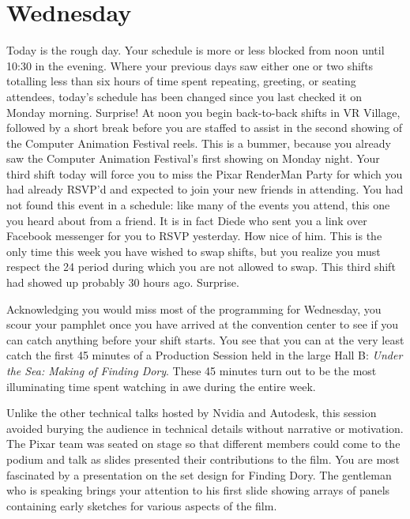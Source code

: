 \documentclass[../main.tex]{subfiles}
\begin{document}
\section{Wednesday}

Today is the rough day. Your schedule is more or less blocked from noon until 10:30 in the evening. Where your previous days saw either one or two shifts totalling less than six hours of time spent repeating, greeting, or seating attendees, today's schedule has been changed since you last checked it on Monday morning. Surprise! At noon you begin back-to-back shifts in VR Village, followed by a short break before you are staffed to assist in the second showing of the Computer Animation Festival reels. This is a bummer, because you already saw the Computer Animation Festival's first showing on Monday night. Your third shift today will force you to miss the Pixar RenderMan Party for which you had already RSVP'd and expected to join your new friends in attending. You had not found this event in a schedule: like many of the events you attend, this one you heard about from a friend. It is in fact Diede who sent you a link over Facebook messenger for you to RSVP yesterday. How nice of him. This is the only time this week you have wished to swap shifts, but you realize you must respect the 24 period during which you are not allowed to swap. This third shift had showed up probably 30 hours ago. Surprise.

Acknowledging you would miss most of the programming for Wednesday, you scour your pamphlet once you have arrived at the convention center to see if you can catch anything before your shift starts.  You see that you can at the very least catch the first 45 minutes of a Production Session held in the large Hall B: \textit{Under the Sea: Making of Finding Dory}. These 45 minutes turn out to be the most illuminating time spent watching in awe during the entire week.

Unlike the other technical talks hosted by Nvidia and Autodesk, this session avoided burying the audience in technical details without narrative or motivation. The Pixar team was seated on stage so that different members could come to the podium and talk as slides presented their contributions to the film. You are most fascinated by a presentation on the set design for Finding Dory. The gentleman who is speaking brings your attention to his first slide showing arrays of panels containing early sketches for various aspects of the film.
\end{document}
